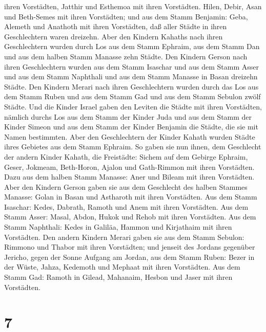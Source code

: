 ihren Vorstädten, Jatthir und Esthemoa mit ihren Vorstädten.
 Hilen, Debir,  Asan und Beth-Semes mit ihren
Vorstädten;  und aus dem Stamm Benjamin: Geba, Alemeth und
Anathoth mit ihren Vorstädten, daß aller Städte in ihren Geschlechtern
waren dreizehn.  Aber den Kindern Kahaths nach ihren
Geschlechtern wurden durch Los aus dem Stamm Ephraim, aus dem Stamm Dan
und aus dem halben Stamm Manasse zehn Städte.  Den Kindern
Gerson nach ihren Geschlechtern wurden aus dem Stamm Isaschar und aus
dem Stamm Asser und aus dem Stamm Naphthali und aus dem Stamm Manasse in
Basan dreizehn Städte.  Den Kindern Merari nach ihren
Geschlechtern wurden durch das Los aus dem Stamm Ruben und aus dem Stamm
Gad und aus dem Stamm Sebulon zwölf Städte.  Und die Kinder
Israel gaben den Leviten die Städte mit ihren Vorstädten, 
nämlich durchs Los aus dem Stamm der Kinder Juda und aus dem Stamm der
Kinder Simeon und aus dem Stamm der Kinder Benjamin die Städte, die sie
mit Namen bestimmten.  Aber den Geschlechtern der Kinder
Kahath wurden Städte ihres Gebietes aus dem Stamm Ephraim. 
So gaben sie nun ihnen, dem Geschlecht der andern Kinder Kahath, die
Freistädte: Sichem auf dem Gebirge Ephraim, Geser, 
Jokmeam, Beth-Horon,  Ajalon und Gath-Rimmon mit ihren
Vorstädten.  Dazu aus dem halben Stamm Manasse: Aner und
Bileam mit ihren Vorstädten.  Aber den Kindern Gerson gaben
sie aus dem Geschlecht des halben Stammes Manasse: Golan in Basan und
Astharoth mit ihren Vorstädten.  Aus dem Stamm Isaschar:
Kedes, Dabrath,  Ramoth und Anem mit ihren Vorstädten.
 Aus dem Stamm Asser: Masal, Abdon,  Hukok und
Rehob mit ihren Vorstädten.  Aus dem Stamm Naphthali: Kedes
in Galiläa, Hammon und Kirjathaim mit ihren Vorstädten. 
Den andern Kindern Merari gaben sie aus dem Stamm Sebulon: Rimmono und
Thabor mit ihren Vorstädten;  und jenseit des Jordans
gegenüber Jericho, gegen der Sonne Aufgang am Jordan, aus dem Stamm
Ruben: Bezer in der Wüste, Jahza,  Kedemoth und Mephaat mit
ihren Vorstädten.  Aus dem Stamm Gad: Ramoth in Gilead,
Mahanaim,  Hesbon und Jaser mit ihren Vorstädten.

\hypertarget{section-6}{%
\section{7}\label{section-6}}

